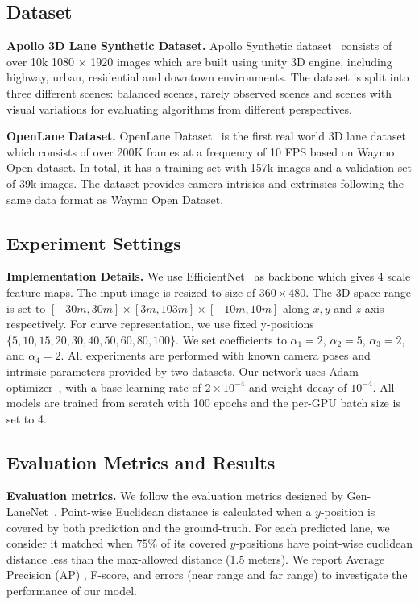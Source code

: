 \documentclass[letterpaper, 10 pt, conference]{ieeeconf}
\begin{document}
\subsection{Dataset}
\textbf{Apollo 3D Lane Synthetic Dataset.} Apollo Synthetic dataset~\cite{guo2020gen} consists of over 10k 1080 × 1920 images which are built using unity 3D engine, including highway, urban, residential and downtown environments. 
The dataset is split into three different scenes: balanced scenes, rarely observed scenes and scenes with visual variations for evaluating algorithms from different perspectives.

\textbf{OpenLane Dataset.} OpenLane Dataset~\cite{chen2022persformer} is the first real world 3D lane dataset which consists of over 200K frames at a frequency of 10 FPS based on Waymo Open dataset\cite{Sun_2020_CVPR, waymo_open_dataset}. In total, it has a training set with 157k images and a validation set of 39k images. The dataset provides camera intrisics and extrinsics following the same data format as Waymo Open Dataset. 


\subsection{Experiment Settings}
\textbf{Implementation Details.}  We use EfficientNet~\cite{tan2019efficientnet} as backbone which gives 4 scale feature maps. The input image is resized to size of $360 \times 480$. The 3D-space range is set to $[-30m,30m] \times [3m,103m] \times [-10m,10m]$ along $x, y$ and $z$ axis respectively. 
For curve representation, we use fixed y-positions $ \{5, 10, 15, 20, 30, 40, 50, 60, 80, 100\}$. We set coefficients to $\alpha_1=2$, $\alpha_2=5$, $\alpha_3=2$, and $\alpha_4=2$. All experiments are performed with known camera poses and intrinsic parameters provided by two datasets. Our network uses Adam optimizer~\cite{kingma2014adam}, with a base learning rate of $2 \times 10^{-4}$ and weight decay of $10^{-4}$. All models are trained from scratch with 100 epochs and the per-GPU batch size is set to 4. 

\subsection{Evaluation Metrics and Results}
\textbf{Evaluation metrics.} We follow the evaluation metrics designed by Gen-LaneNet~\cite{guo2020gen}. Point-wise Euclidean distance is calculated when a $y$-position is covered by both prediction and the ground-truth. 
For each predicted lane, we consider it matched when $ 75\% $ of its covered $y$-positions have point-wise euclidean distance less than the max-allowed distance (1.5 meters). We report Average Precision (AP) , F-score, and errors (near range and far range) to investigate the performance of our model. 
\end{document}
